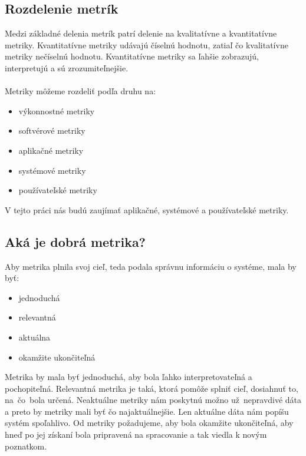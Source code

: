 \documentclass[a4paper, upjsfrontpage, thesismargins, thesislinespacing]{rnthesis}
\begin{document}
\subsection{Rozdelenie metrík}

Medzi základné delenia metrík patrí delenie na kvalitatívne a kvantitatívne metriky.
Kvantitatívne metriky udávajú číselnú hodnotu, zatiaľ čo kvalitatívne metriky nečíselnú hodnotu.  
Kvantitatívne metriky sa ľahšie zobrazujú, interpretujú a sú zrozumiteľnejšie.
~\\
~\\
Metriky môžeme rozdeliť podľa druhu na:

\begin{itemize}
	\item výkonnostné metriky
	\item softvérové metriky
	\item aplikačné metriky
	\item systémové metriky
	\item používateľské metriky
\end{itemize}

V tejto práci nás budú zaujímať aplikačné, systémové a používateľské metriky.

\subsection{Aká je dobrá metrika?}

Aby metrika plnila svoj cieľ, teda podala správnu informáciu o systéme, mala by byť:
\begin{itemize}
	\item jednoduchá
	\item relevantná
	\item aktuálna
	\item okamžite ukončiteľná
\end{itemize}

Metrika by mala byť jednoduchá, aby bola ľahko interpretovateľná a pochopiteľná.
Relevantná metrika je taká, ktorá pomôže splniť cieľ, dosiahnuť to, na~čo~bola určená.
Neaktuálne metriky nám poskytnú možno už~nep\-ravdivé dáta a preto by metriky mali byť čo najaktuálnejšie. 
Len aktuálne dáta nám popíšu systém spoľahlivo.
Od metriky požadujeme, aby bola okamžite ukončiteľná, aby hneď po jej získaní bola pripravená na spracovanie a tak viedla k novým poznatkom.
\end{document}
